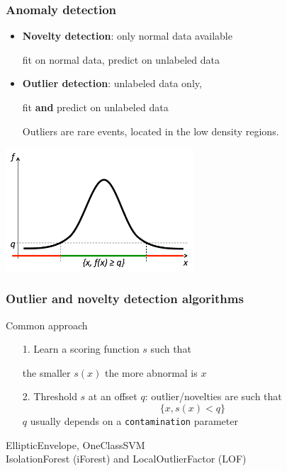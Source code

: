 \documentclass[slidetop,11pt]{beamer}
\begin{document}
\begin{frame}\frametitle{Anomaly detection}
    
\begin{itemize}
\item \textbf{Novelty detection}: only normal data available
\begin{center}
fit on normal data, predict on unlabeled data
\end{center}
\item \textbf{Outlier detection}: unlabeled data only,
\begin{center}
fit \textbf{and} predict on unlabeled data
\end{center}

Outliers are rare events, located in the low density regions.
\end{itemize}
\begin{center}
\includegraphics[width=7cm]{dls3.pdf}
\end{center}

\end{frame}


\begin{frame}
\frametitle{Outlier and novelty detection algorithms}

Common approach

\vspace{0.5cm}

\begin{enumerate}
\item[1.] Learn a scoring function $s$ such that
\begin{center}
the smaller $s(x)$ the more abnormal is $x$
\end{center}

\vspace{0.5cm}

\item[2.] Threshold $s$ at an offset $q$: outlier/novelties are such that
\begin{equation*}
\{x, s(x) < q \}
\end{equation*}
$q$ usually depends on a \texttt{contamination} parameter
\end{enumerate}

\begin{center}
EllipticEnvelope, OneClassSVM \\
IsolationForest (iForest) and LocalOutlierFactor (LOF)
\end{center}

\end{frame}
\end{document}
